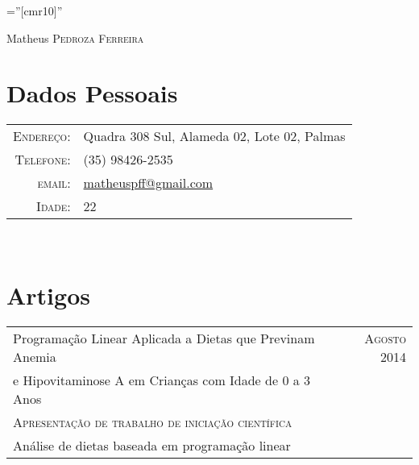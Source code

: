 \documentclass[a4paper,10pt]{article}
\begin{document}

\pagestyle{empty} %

\font\fb=''[cmr10]'' %

\par{\centering
		{\Huge Matheus \textsc{Pedroza Ferreira}
	}\bigskip\par}

\section{Dados Pessoais}

\begin{tabular}{rl}
    \textsc{Endereço:}   & Quadra 308 Sul, Alameda 02, Lote 02, Palmas \\
    \textsc{Telefone:}   & (35) 98426-2535 \\
    \textsc{email:}      & \href{mailto:matheuspff@gmail.com}{matheuspff@gmail.com} \\
    \textsc{Idade:}      & 22 \\
\end{tabular}\\





\section{Artigos}

\begin{tabular}{p{11cm}|r}
  Programação Linear Aplicada a Dietas que Previnam Anemia  & \textsc{Agosto 2014} \\
  e Hipovitaminose A em Crianças com Idade de 0 a 3 Anos & \\
  \textsc{Apresentação de trabalho de iniciação científica} & \\
  \footnotesize{Análise de dietas baseada em programação linear} & \\
\end{tabular}\\
\end{document}
